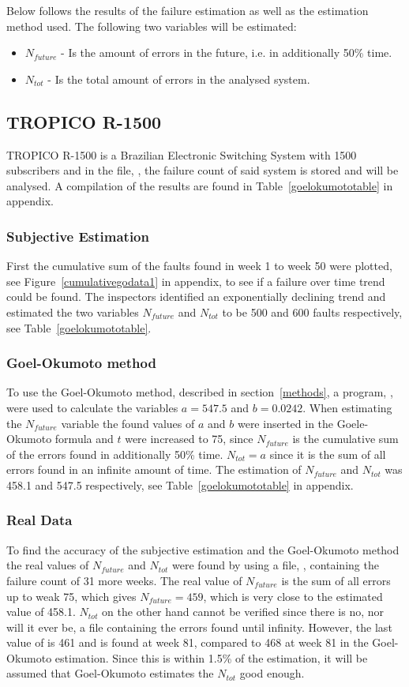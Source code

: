 Below follows the results of the failure estimation as well as the estimation method used. 
The following two variables will be estimated:
\begin{itemize}
 \item $N_{future}$ - Is the amount of errors in the future, i.e. in additionally 50\% time.
 \item $N_{tot}$ - Is the total amount of errors in the analysed system.
\end{itemize}

\subsection{TROPICO R-1500}
TROPICO R-1500 is a Brazilian Electronic Switching System with 1500 subscribers and in the file, , the failure count of said system is stored and will be analysed. A compilation of the results are found in Table~\ref{goelokumototable} in appendix.
\subsubsection*{Subjective Estimation} 
First the cumulative sum of the faults found in week 1 to week 50 were plotted, see Figure~\ref{cumulativegodata1} in appendix, to see if a failure over time trend could be found.
The inspectors identified an exponentially declining trend and estimated the two variables $N_{future}$ and $N_{tot}$ to be 500 and 600 faults respectively, see Table~\ref{goelokumototable}. 
\subsubsection*{Goel-Okumoto method}
To use the Goel-Okumoto method, described in section~\ref{methods}, a program, , were used to calculate the variables $a=547.5$ and $b=0.0242$.
When estimating the $N_{future}$ variable the found values of $a$ and $b$ were inserted in the Goele-Okumoto formula and $t$ were increased to 75, since $N_{future}$ is the cumulative sum of the errors found in additionally 50\% time. 
$N_{tot} = a$ since it is the sum of all errors found in an infinite amount of time.
The estimation of $N_{future}$ and $N_{tot}$ was 458.1 and 547.5 respectively, see Table~\ref{goelokumototable} in appendix.
\subsubsection*{Real Data}
To find the accuracy of the subjective estimation and the Goel-Okumoto method the real values of $N_{future}$ and $N_{tot}$ were found by using a file, , containing the failure count of 31 more weeks. 
The real value of $N_{future}$ is the sum of all errors up to weak 75, which gives $N_{future}=459$, which is very close to the estimated value of 458.1. $N_{tot}$ on the other hand cannot be verified since there is no, nor will it ever be, a file containing the errors found until infinity. However, the last value of  is 461 and is found at week 81, compared to 468 at week 81 in the Goel-Okumoto estimation. Since this is within 1.5\% of the estimation, it will be assumed that Goel-Okumoto estimates the $N_{tot}$ good enough.



